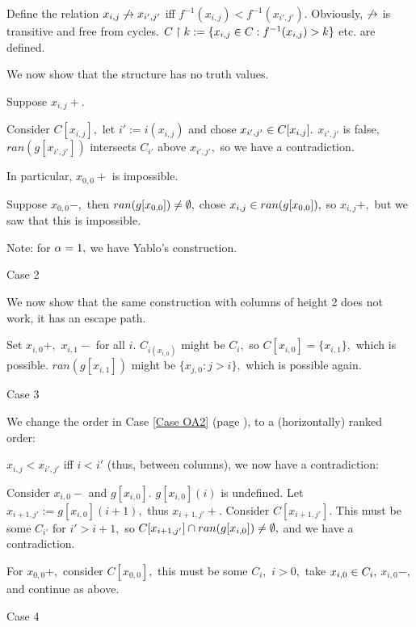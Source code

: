 Define the relation $x_{i,j} \not\rightarrow x_{i',j' }$ iff
$f^{-1}(x_{i,j})<f^{-1}(x_{i',j' }).$ Obviously,
$ \not\rightarrow $ is transitive and free from cycles.
$C \upharpoonright k:=\{x_{i,j} \in C:f^{-1}(x_{i,j}) > k\}$ etc. are defined.

We now show that the structure has no truth values.

Suppose $x_{i,j}+.$

Consider $C[x_{i,j}],$ let $i':=i(x_{i,j})$ and chose $x_{i',j' } \in
C[x_{i,j}].$
$x_{i',j' }$ is false, $ran(g[x_{i',j' }])$ intersects $C_{i' }$ above
$x_{i',j' },$ so we have a contradiction.

In particular, $x_{0,0}+$ is impossible.

Suppose $x_{0,0}-,$ then $ran(g[x_{0,0}]) \neq \emptyset,$ chose $x_{i,j} \in
ran(g[x_{0,0}]),$ so $x_{i,j}+,$
but we saw that this is impossible.

Note: for $ \alpha =1,$ we have Yablo's construction.

 \xDH Case 2


\label{Case OA2}

We now show that the same construction with columns of height 2
does not work, it has an escape path.

Set $x_{i,0}+,$ $x_{i,1}-$ for all $i.$ $C_{i(x_{i,0})}$ might be $C_{i},$
so $C[x_{i,0}]=\{x_{i,1}\},$ which
is possible. $ran(g[x_{i,1}])$ might be $\{x_{j,0}:j>i\},$ which is
possible again.

 \xDH
Case 3


\label{Case OA3}

We change the order in
Case \ref{Case OA2} (page \pageref{Case OA2}),
to a (horizontally) ranked order:

$x_{i,j}<x_{i',j' }$ iff $i<i' $ (thus, between columns), we now have a
contradiction:

Consider $x_{i,0}-$ and $g[x_{i,0}].$ $g[x_{i,0}](i)$ is undefined. Let
$x_{i+1,j' }:=g[x_{i,0}](i+1),$ thus $x_{i+1,j' }+.$
Consider $C[x_{i+1,j' }].$ This must be some $C_{i' }$ for $i' >i+1,$
so $C[x_{i+1,j' }] \cap ran(g[x_{i,0}]) \neq \emptyset,$ and we have a
contradiction.

For $x_{0,0}+,$ consider $C[x_{0,0}],$ this must be some $C_{i},$ $i>0,$
take $x_{i,0} \in C_{i},$ $x_{i,0}-,$ and
continue as above.

 \xDH
Case 4


\label{Case OA4}

